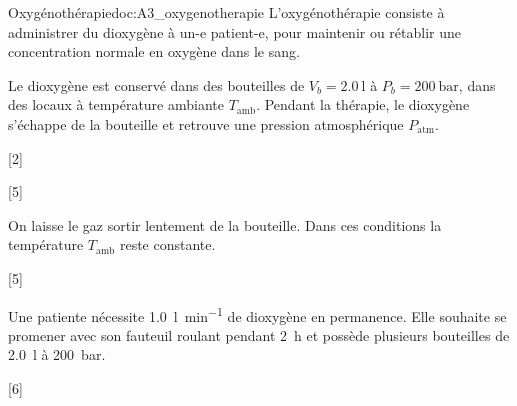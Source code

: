 \begin{doc}{Oxygénothérapie}{doc:A3_oxygenotherapie}
  L'oxygénothérapie consiste à administrer du dioxygène à un-e patient-e, pour maintenir ou rétablir une concentration normale en oxygène dans le sang.

  Le dioxygène est conservé dans des bouteilles de $V_b = \qty{2,0}{\litre}$ à $P_b = \qty{200}{\bar}$, dans des locaux à température ambiante $T_\text{amb}$.
  Pendant la thérapie, le dioxygène s'échappe de la bouteille et retrouve une pression atmosphérique $P_\text{atm}$.
\end{doc}

[2]

\newpage
{}[5]

\medskip
On laisse le gaz sortir lentement de la bouteille.
Dans ces conditions la température $T_\text{amb}$ reste constante.

[5]

\medskip
Une patiente nécessite \qty{1,0}{\litre\per\minute} de dioxygène en permanence.
Elle souhaite se promener avec son fauteuil roulant pendant \qty{2}{\hour} et possède plusieurs bouteilles de \qty{2,0}{\litre} à \qty{200}{\bar}.

[6]
